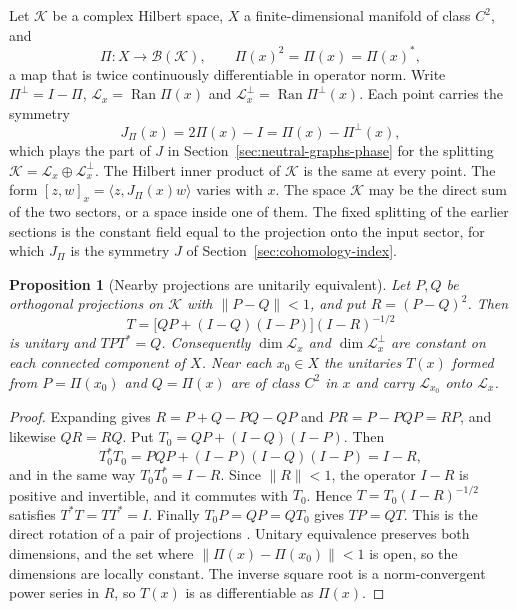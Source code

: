 \documentclass[11pt]{article}
\newtheorem{proposition}{Proposition}[section]
\theoremstyle{definition}
\DeclareMathOperator{\Ran}{Ran}
\begin{document}
Let $\mathcal K$ be a complex Hilbert space, $X$ a finite-dimensional manifold of class $C^2$, and
\begin{equation}
 \Pi:X\to\mathcal B(\mathcal K),\qquad \Pi(x)^2=\Pi(x)=\Pi(x)^* ,
 \label{eq:moving-projection-field}
\end{equation}
a map that is twice continuously differentiable in operator norm. Write $\Pi^\perp=I-\Pi$, $\mathcal L_x=\Ran\Pi(x)$ and $\mathcal L_x^\perp=\Ran\Pi^\perp(x)$. Each point carries the symmetry
\begin{equation}
 J_\Pi(x)=2\Pi(x)-I=\Pi(x)-\Pi^\perp(x),
 \label{eq:moving-symmetry}
\end{equation}
which plays the part of $J$ in Section~\ref{sec:neutral-graphs-phase} for the splitting $\mathcal K=\mathcal L_x\oplus\mathcal L_x^\perp$. The Hilbert inner product of $\mathcal K$ is the same at every point. The form $[z,w]_x=\langle z,J_\Pi(x)w\rangle$ varies with $x$. The space $\mathcal K$ may be the direct sum of the two sectors, or a space inside one of them. The fixed splitting of the earlier sections is the constant field equal to the projection onto the input sector, for which $J_\Pi$ is the symmetry $J$ of Section~\ref{sec:cohomology-index}.

\begin{proposition}[Nearby projections are unitarily equivalent]
\label{prop:moving-unitary}
Let $P,Q$ be orthogonal projections on $\mathcal K$ with $\|P-Q\|<1$, and put $R=(P-Q)^2$. Then
\begin{equation}
 T=\bigl[QP+(I-Q)(I-P)\bigr](I-R)^{-1/2}
 \label{eq:moving-direct-rotation}
\end{equation}
is unitary and $TPT^*=Q$. Consequently $\dim\mathcal L_x$ and $\dim\mathcal L_x^\perp$ are constant on each connected component of $X$. Near each $x_0\in X$ the unitaries $T(x)$ formed from $P=\Pi(x_0)$ and $Q=\Pi(x)$ are of class $C^2$ in $x$ and carry $\mathcal L_{x_0}$ onto $\mathcal L_x$.
\end{proposition}
\begin{proof}
Expanding gives $R=P+Q-PQ-QP$ and $PR=P-PQP=RP$, and likewise $QR=RQ$. Put $T_0=QP+(I-Q)(I-P)$. Then
\[
 T_0^*T_0=PQP+(I-P)(I-Q)(I-P)=I-R ,
\]
and in the same way $T_0T_0^*=I-R$. Since $\|R\|<1$, the operator $I-R$ is positive and invertible, and it commutes with $T_0$. Hence $T=T_0(I-R)^{-1/2}$ satisfies $T^*T=TT^*=I$. Finally $T_0P=QP=QT_0$ gives $TP=QT$. This is the direct rotation of a pair of projections \cite[Ch.~I, \S\S4.6 and 6.8]{Kato}. Unitary equivalence preserves both dimensions, and the set where $\|\Pi(x)-\Pi(x_0)\|<1$ is open, so the dimensions are locally constant. The inverse square root is a norm-convergent power series in $R$, so $T(x)$ is as differentiable as $\Pi(x)$.
\end{proof}
\end{document}
